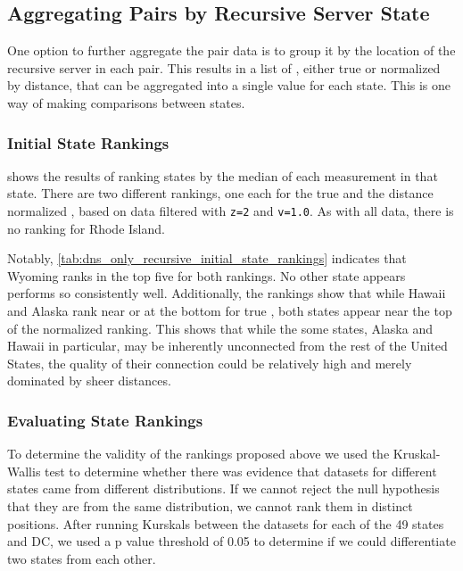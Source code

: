 \subsection{Aggregating Pairs by Recursive Server State}

One option to further aggregate the pair data is to group it by the location of the recursive server in each pair. This results in a list of \rtts, either true or normalized by distance, that can be aggregated into a single value for each state. This is one way of making comparisons between states.

\subsubsection{Initial State Rankings}

 shows the results of ranking states by the median of each measurement in that state. There are two different rankings, one each for the true \rtt and the distance normalized \rtt, based on data filtered with \texttt{z=2} and \texttt{v=1.0}. As with all \dns data, there is no ranking for Rhode Island.



Notably, \cref{tab:dns_only_recursive_initial_state_rankings} indicates that Wyoming ranks in the top five for both rankings. No other state appears performs so consistently well. Additionally, the rankings show that while Hawaii and Alaska rank near or at the bottom for true \rtt, both states appear near the top of the normalized ranking. This shows that while the some states, Alaska and Hawaii in particular, may be inherently unconnected from the rest of the United States, the quality of their connection could be relatively high and merely dominated by sheer distances.

\subsubsection{Evaluating State Rankings}

To determine the validity of the rankings proposed above we used the Kruskal-Wallis test to determine whether there was evidence that datasets for different states came from different distributions. If we cannot reject the null hypothesis that they are from the same distribution, we cannot rank them in distinct positions. After running Kurskals between the datasets for each of the 49 states and DC, we used a p value threshold of 0.05 to determine if we could differentiate two states from each other. 

